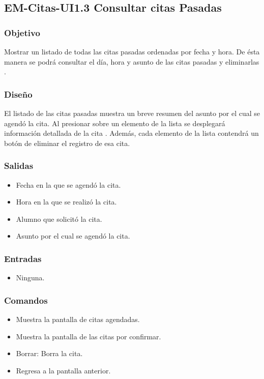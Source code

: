\subsection{EM-Citas-UI1.3 Consultar citas Pasadas}

\subsubsection{Objetivo}
	\noindent
	Mostrar un listado de todas las citas pasadas ordenadas por fecha y hora. De ésta manera se podrá consultar el día, hora y asunto de las citas pasadas y eliminarlas .

\subsubsection{Diseño}
	\noindent
	El listado de las citas pasadas muestra un breve resumen del asunto por el cual se agendó la cita.
	Al presionar sobre un elemento de la lista se desplegará información detallada de 
	la cita . Además, cada elemento de la lista contendrá un botón de eliminar el registro de esa cita.


\subsubsection{Salidas}
	\begin{itemize}
		\item Fecha en la que se agendó la cita.
		\item Hora en la que se realizó la cita.
		\item Alumno que solicitó la cita.
		\item Asunto por el cual se agendó la cita.
	\end{itemize}

\subsubsection{Entradas}

\begin{itemize}
	\item Ninguna.
\end{itemize}

\subsubsection{Comandos}
\begin{itemize}
	\item {} Muestra la pantalla de citas agendadas.
	\item {} Muestra la pantalla de las citas por confirmar.
	\item Borrar: Borra la cita.
	\item {} Regresa a la pantalla anterior.
\end{itemize}

